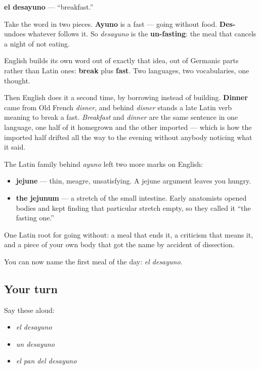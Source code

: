 \begin{cousinweb}
\textbf{el desayuno} — \textquotedblleft{}breakfast.\textquotedblright{}

Take the word in two pieces. \textbf{Ayuno} is a fast — going without food. \textbf{Des-} undoes whatever follows it. So \emph{desayuno} is the \textbf{un-fasting}: the meal that cancels a night of not eating.

English builds its own word out of exactly that idea, out of Germanic parts rather than Latin ones: \textbf{break} plus \textbf{fast}. Two languages, two vocabularies, one thought.

Then English does it a second time, by borrowing instead of building. \textbf{Dinner} came from Old French \emph{disner}, and behind \emph{disner} stands a late Latin verb meaning to break a fast. \emph{Breakfast} and \emph{dinner} are the same sentence in one language, one half of it homegrown and the other imported — which is how the imported half drifted all the way to the evening without anybody noticing what it said.

The Latin family behind \emph{ayuno} left two more marks on English:

\begin{itemize}
\raggedright
  \item \textbf{jejune} — thin, meagre, unsatisfying. A jejune argument leaves you hungry.
  \item \textbf{the jejunum} — a stretch of the small intestine. Early anatomists opened bodies and kept finding that particular stretch empty, so they called it \textquotedblleft{}the fasting one.\textquotedblright{}
\end{itemize}

One Latin root for going without: a meal that ends it, a criticism that means it, and a piece of your own body that got the name by accident of dissection.
\end{cousinweb}

\begin{grammarlens}[title={What you've built}]
You can now name the first meal of the day: \emph{el desayuno}.
\end{grammarlens}

\subsection*{Your turn}
Say these aloud:

\begin{itemize}
\raggedright
  \item \emph{el desayuno}
  \item \emph{un desayuno}
  \item \emph{el pan del desayuno}
\end{itemize}

